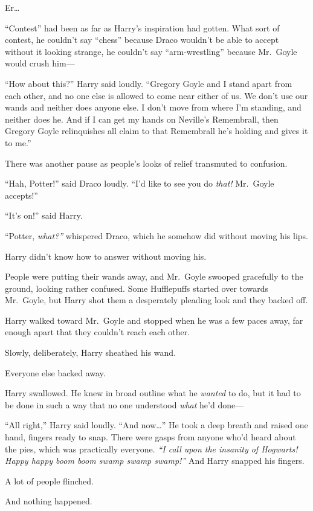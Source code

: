 Er\ldots{}

``Contest'' had been as far as Harry's inspiration had gotten. What sort
of contest, he couldn't say ``chess'' because Draco wouldn't be able to
accept without it looking strange, he couldn't say ``arm-wrestling''
because Mr.~Goyle would crush him---

``How about this?'' Harry said loudly. ``Gregory Goyle and I stand apart
from each other, and no one else is allowed to come near either of us.
We don't use our wands and neither does anyone else. I don't move from
where I'm standing, and neither does he. And if I can get my hands on
Neville's Remembrall, then Gregory Goyle relinquishes all claim to that
Remembrall he's holding and gives it to me.''

There was another pause as people's looks of relief transmuted to
confusion.

``Hah, Potter!'' said Draco loudly. ``I'd like to see you do
\emph{that!} Mr.~Goyle accepts!''

``It's on!'' said Harry.

``Potter, \emph{what?''} whispered Draco, which he somehow did without
moving his lips.

Harry didn't know how to answer without moving his.

People were putting their wands away, and Mr.~Goyle swooped gracefully
to the ground, looking rather confused. Some Hufflepuffs started over
towards Mr.~Goyle, but Harry shot them a desperately pleading look and
they backed off.

Harry walked toward Mr.~Goyle and stopped when he was a few paces away,
far enough apart that they couldn't reach each other.

Slowly, deliberately, Harry sheathed his wand.

Everyone else backed away.

Harry swallowed. He knew in broad outline what he \emph{wanted} to do,
but it had to be done in such a way that no one understood \emph{what}
he'd done---

``All right,'' Harry said loudly. ``And now\ldots{}'' He took a deep
breath and raised one hand, fingers ready to snap. There were gasps from
anyone who'd heard about the pies, which was practically everyone.
\emph{``I call upon the insanity of Hogwarts! Happy happy boom boom
swamp swamp swamp!''} And Harry snapped his fingers.

A lot of people flinched.

And nothing happened.

